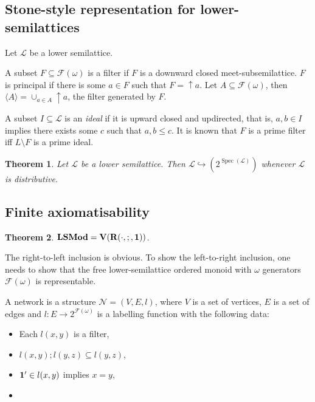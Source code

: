 \documentclass[a4paper]{article}
\theoremstyle{defin}
\theoremstyle{theorem}
\newtheorem{theorem}{Theorem}
\theoremstyle{claim}
\theoremstyle{prop}
\theoremstyle{lemma}
\theoremstyle{fact}
\theoremstyle{ex}
\theoremstyle{col}
\begin{document}
\subsection{Stone-style representation for lower-semilattices}

Let $\mathcal{L}$ be a lower semilattice.

A subset $F \subseteq \mathcal{F}(\omega)$ is a filter if $F$ is a downward closed meet-subsemilattice. $F$ is principal if there is some $a \in F$ such that $F = \uparrow a$. Let $A \subseteq \mathcal{F}(\omega)$, then $\langle A \rangle = \cup_{a \in A} \uparrow a$, the filter generated by $F$.

A subset $I \subseteq \mathcal{L}$ is an \emph{ideal} if it is upward closed and updirected, that is, $a, b \in I$ implies there exists some $c$ such that $a, b \leq c$. It is known that $F$ is a prime filter iff $L \setminus F$ is a prime ideal.

\begin{theorem}
Let $\mathcal{L}$ be a lower semilattice. Then $\mathcal{L} \hookrightarrow (2^{\operatorname{Spec}(\mathcal{L})})$ whenever $\mathcal{L}$ is distributive.
\end{theorem}

\subsection{Finite axiomatisability}

\begin{theorem}
${\bf LSMod} = {\bf V}({\bf R}(\cdot, ;, {\bf 1}))$.
\end{theorem}

The right-to-left inclusion is obvious. To show the left-to-right inclusion, one needs to show that the free lower-semilattice ordered monoid with $\omega$ generators $\mathcal{F}(\omega)$ is representable.

A network is a structure $\mathcal{N} = (V, E, l)$, where $V$ is a set of vertices, $E$ is a set of edges and $l : E \to 2^{\mathcal{F}(\omega)}$ is a labelling function with the following data:
\begin{itemize}
\item Each $l(x,y)$ is a filter,
\item $l(x,y) ; l(y, z) \subseteq l(y, z)$,
\item ${\bf 1'} \in l(x, y)$ implies $x = y$,
\item
\end{itemize}
\end{document}

